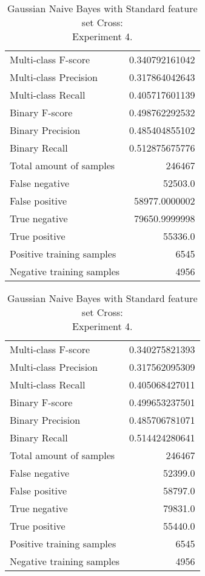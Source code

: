 \begin{table}[H]
\begin{minipage}{0.5\textwidth}
\caption{Gaussian Naive Bayes with Standard feature set Cross: \\Experiment 3.}
\centering
\begin{tabular}{l r}
\toprule
Multi-class F-score & 0.340792161042 \\
Multi-class Precision & 0.317864042643 \\
Multi-class Recall & 0.405717601139 \\
\midrule
Binary F-score & 0.498762292532 \\
Binary Precision & 0.485404855102 \\
Binary Recall & 0.512875675776 \\
\midrule
Total amount of samples & 246467 \\
False negative & 52503.0 \\
False positive & 58977.0000002 \\
True negative & 79650.9999998 \\
True positive & 55336.0 \\
\midrule
Positive training samples & 6545 \\
Negative training samples & 4956 \\
\bottomrule
\end{tabular}
\end{minipage}
\hfillx
\begin{minipage}{0.5\textwidth}
\caption{Gaussian Naive Bayes with Standard feature set Cross: \\Experiment 4.}
\centering
\begin{tabular}{l r}
\toprule
Multi-class F-score & 0.340275821393 \\
Multi-class Precision & 0.317562095309 \\
Multi-class Recall & 0.405068427011 \\
\midrule
Binary F-score & 0.499653237501 \\
Binary Precision & 0.485706781071 \\
Binary Recall & 0.514424280641 \\
\midrule
Total amount of samples & 246467 \\
False negative & 52399.0 \\
False positive & 58797.0 \\
True negative & 79831.0 \\
True positive & 55440.0 \\
\midrule
Positive training samples & 6545 \\
Negative training samples & 4956 \\
\bottomrule
\end{tabular}
\end{minipage}
\end{table}
